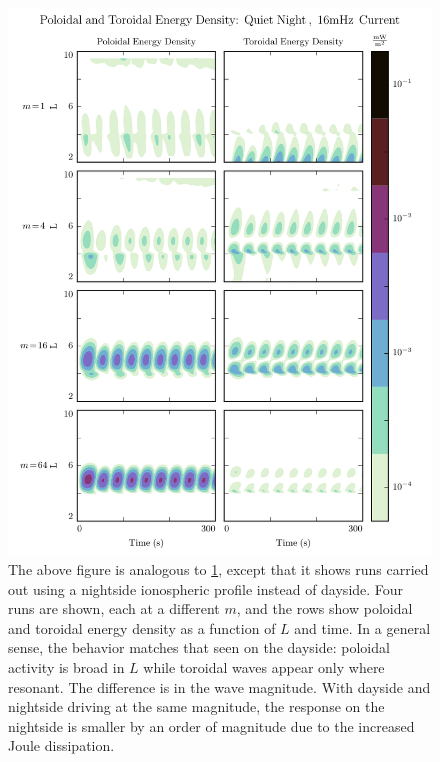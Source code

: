 \documentclass{article}
\newcommand{\azm}{\ensuremath{m}\xspace}
\begin{document}

\begin{figure}
    \label{fig_layers_night}
    \begin{center}
    \includegraphics[width=\textwidth]{figures/fig_layers_night.pdf}
    \caption{
        The above figure is analogous to \cref{fig_layers_night}, except that it shows runs carried out using a nightside ionospheric profile instead of dayside. Four runs are shown, each at a different \azm, and the rows show poloidal and toroidal energy density as a function of $L$ and time. In a general sense, the behavior matches that seen on the dayside: poloidal activity is broad in $L$ while toroidal waves appear only where resonant. The difference is in the wave magnitude. With dayside and nightside driving at the same magnitude, the response on the nightside is smaller by an order of magnitude due to the increased Joule dissipation. 
    }
    \end{center}
\end{figure}
\end{document}
